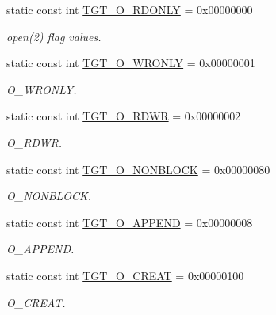 \begin{Indent}{\bf }\par
{\em \label{_amgrpd41d8cd98f00b204e9800998ecf8427e}
 }\begin{DoxyCompactItemize}
\item 
static const int \hyperlink{classMipsLinux_ad266b23a0ae07d1833e18bae651f3411}{TGT\_\-O\_\-RDONLY} = 0x00000000
\begin{DoxyCompactList}\small\item\em open(2) flag values. \item\end{DoxyCompactList}\item 
static const int \hyperlink{classMipsLinux_a6156c069cefe05ce3cce033b2e0c2de2}{TGT\_\-O\_\-WRONLY} = 0x00000001
\begin{DoxyCompactList}\small\item\em O\_\-WRONLY. \item\end{DoxyCompactList}\item 
static const int \hyperlink{classMipsLinux_ac6fa9ecf5d2f3314f197698f1099e2ac}{TGT\_\-O\_\-RDWR} = 0x00000002
\begin{DoxyCompactList}\small\item\em O\_\-RDWR. \item\end{DoxyCompactList}\item 
static const int \hyperlink{classMipsLinux_a0ea5420b4c9b45ba342a266fb77ac942}{TGT\_\-O\_\-NONBLOCK} = 0x00000080
\begin{DoxyCompactList}\small\item\em O\_\-NONBLOCK. \item\end{DoxyCompactList}\item 
static const int \hyperlink{classMipsLinux_af11adc5404ea3780a5ce2829cc3710b7}{TGT\_\-O\_\-APPEND} = 0x00000008
\begin{DoxyCompactList}\small\item\em O\_\-APPEND. \item\end{DoxyCompactList}\item 
static const int \hyperlink{classMipsLinux_aec02e04ca367e6c3f4b46e4edc12efac}{TGT\_\-O\_\-CREAT} = 0x00000100
\begin{DoxyCompactList}\small\item\em O\_\-CREAT. \item\end{DoxyCompactList}\item 

\end{DoxyCompactItemize}
\end{Indent}
